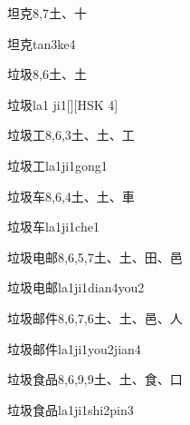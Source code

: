 \begin{entry}{坦克}{8,7}{⼟、⼗}
  \begin{phonetics}{坦克}{tan3ke4}
  \end{phonetics}
\end{entry}

\begin{entry}{垃圾}{8,6}{⼟、⼟}
  \begin{phonetics}{垃圾}{la1 ji1}[][HSK 4]
  \end{phonetics}
\end{entry}

\begin{entry}{垃圾工}{8,6,3}{⼟、⼟、⼯}
  \begin{phonetics}{垃圾工}{la1ji1gong1}
  \end{phonetics}
\end{entry}

\begin{entry}{垃圾车}{8,6,4}{⼟、⼟、⾞}
  \begin{phonetics}{垃圾车}{la1ji1che1}
  \end{phonetics}
\end{entry}

\begin{entry}{垃圾电邮}{8,6,5,7}{⼟、⼟、⽥、⾢}
  \begin{phonetics}{垃圾电邮}{la1ji1dian4you2}
  \end{phonetics}
\end{entry}

\begin{entry}{垃圾邮件}{8,6,7,6}{⼟、⼟、⾢、⼈}
  \begin{phonetics}{垃圾邮件}{la1ji1you2jian4}
  \end{phonetics}
\end{entry}

\begin{entry}{垃圾食品}{8,6,9,9}{⼟、⼟、⾷、⼝}
  \begin{phonetics}{垃圾食品}{la1ji1shi2pin3}
  \end{phonetics}
\end{entry}

